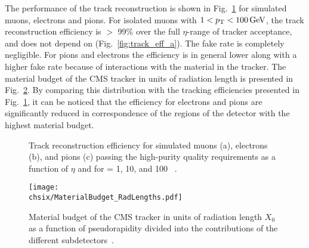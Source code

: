 The performance of the track reconstruction is shown in Fig.~\ref{fig:track_eff} for simulated muons, electrons and pions.
For isolated muons with $1 < p_{\mathrm{T}} < 100\,\text{Ge\hspace{-.08em}V}$, the track reconstruction efficiency is $>$ 99\% over the full $\eta$-range of tracker acceptance, and does not depend on \pt (Fig.~\ref{fig:track_eff_a}). The fake rate is completely negligible. For pions and electrons the efficiency is in general lower along with a higher fake rate because of interactions with the material in the tracker. The material budget of the CMS tracker in units of radiation length is presented in Fig.~\ref{fig:budgetCMStracker}. By comparing this distribution with the tracking efficiencies presented in Fig.~\ref{fig:track_eff}, it can be noticed that the efficiency for electrons and pions are significantly reduced in correspondence of the regions of the detector with the highest material budget.

\begin{figure}[!htb]
\centering
{}
\caption{Track reconstruction efficiency for simulated muons (a), electrons (b), and pions (c) passing the high-purity quality requirements as a function of $\eta$ and for \pt = 1, 10, and 100 \GeV~\cite{Chatrchyan:2014fea}.}
\label{fig:track_eff}
\end{figure}

\begin{figure}[!htb]
 \begin{center}
  \texttt{[image: \\chsix/MaterialBudget\_RadLengths.pdf]}
 \end{center}
 \caption{Material budget of the CMS tracker in units of radiation length $X_0$ as a function of pseudorapidity divided into the contributions of the different subdetectors~\cite{Chatrchyan:2014fea}.}
 \label{fig:budgetCMStracker}
\end{figure}

